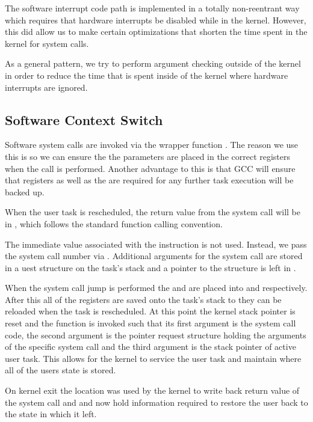 \documentclass[pdftex,10pt,a4paper]{article}
\begin{document}
The software interrupt code path is implemented in a totally
non-reentrant way which requires that hardware interrupts be disabled
while in the kernel. However, this did allow us to make certain
optimizations that shorten the time spent in the kernel for system calls.

As a general pattern, we try to perform argument checking outside of
the kernel in order to reduce the time that is spent inside of the
kernel where hardware interrupts are ignored.

\subsection*{Software Context Switch}
Software system calls are invoked via the wrapper function
. The reason we use this is so we can ensure the the
parameters are placed in the correct registers when the  call
is performed. Another advantage to this is that GCC will ensure that
registers  as well as the  are required for any further
task execution will be backed up.

When the user task is rescheduled, the return value from the system
call will be in , which follows the standard function calling
convention.

The immediate value associated with the  instruction is not
used. Instead, we pass the system call number via . Additional
arguments for the system call are stored in a uest
structure on the task's stack and a pointer to the structure is left
in .

When the system call jump is performed the  and  are
placed into  and  respectively. After this all of the
registers are saved onto the task's stack to they can be reloaded when
the task is rescheduled. At this point the kernel stack pointer is reset
and the function  is invoked such that its first
argument is the system call code, the second argument is the pointer request
structure holding the arguments of the specific system call and the third
argument is the stack pointer of active user task. This allows for the kernel
to service the user task and maintain where all of the users state is stored.

On kernel exit the  location was used by the kernel to write 
back return value of the system call and  and  now
hold information required to restore the user back to the state in which it
left.
\end{document}
